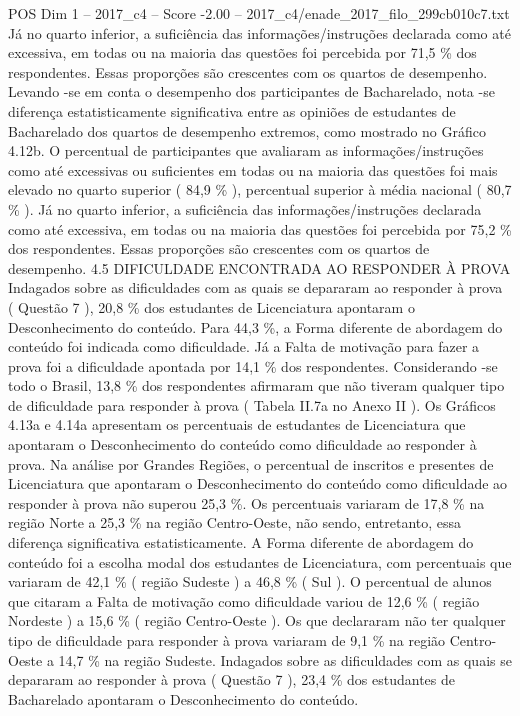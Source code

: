 \begin{textsample}{POS Dim 1 – 2017\_c4 – Score -2.00 – 2017\_c4/enade\_2017\_filo\_299cb010c7.txt}
Já no quarto inferior, a suficiência das informações/instruções declarada como até excessiva, em todas ou na maioria das questões foi percebida por 71,5 \% dos respondentes.
Essas proporções são crescentes com os quartos de desempenho.
Levando -se em conta o desempenho dos participantes de Bacharelado, nota -se diferença estatisticamente significativa entre as opiniões de estudantes de Bacharelado dos quartos de desempenho extremos, como mostrado no Gráfico 4.12b.
O percentual de participantes que avaliaram as informações/instruções como até excessivas ou suficientes em todas ou na maioria das questões foi mais elevado no quarto superior ( 84,9 \% ), percentual superior à média nacional ( 80,7 \% ).
Já no quarto inferior, a suficiência das informações/instruções declarada como até excessiva, em todas ou na maioria das questões foi percebida por 75,2 \% dos respondentes.
Essas proporções são crescentes com os quartos de desempenho. 4.5 DIFICULDADE ENCONTRADA AO RESPONDER À PROVA Indagados sobre as dificuldades com as quais se depararam ao responder à prova ( Questão 7 ), 20,8 \% dos estudantes de Licenciatura apontaram o Desconhecimento do conteúdo.
Para 44,3 \%, a Forma diferente de abordagem do conteúdo foi indicada como dificuldade.
Já a Falta de motivação para fazer a prova foi a dificuldade apontada por 14,1 \% dos respondentes.
Considerando -se todo o Brasil, 13,8 \% dos respondentes afirmaram que não tiveram qualquer tipo de dificuldade para responder à prova ( Tabela II.7a no Anexo II ).
Os Gráficos 4.13a e 4.14a apresentam os percentuais de estudantes de Licenciatura que apontaram o Desconhecimento do conteúdo como dificuldade ao responder à prova.
Na análise por Grandes Regiões, o percentual de inscritos e presentes de Licenciatura que apontaram o Desconhecimento do conteúdo como dificuldade ao responder à prova não superou 25,3 \%.
Os percentuais variaram de 17,8 \% na região Norte a 25,3 \% na região Centro-Oeste, não sendo, entretanto, essa diferença significativa estatisticamente.
A Forma diferente de abordagem do conteúdo foi a escolha modal dos estudantes de Licenciatura, com percentuais que variaram de 42,1 \% ( região Sudeste ) a 46,8 \% ( Sul ).
O percentual de alunos que citaram a Falta de motivação como dificuldade variou de 12,6 \% ( região Nordeste ) a 15,6 \% ( região Centro-Oeste ).
Os que declararam não ter qualquer tipo de dificuldade para responder à prova variaram de 9,1 \% na região Centro-Oeste a 14,7 \% na região Sudeste.
Indagados sobre as dificuldades com as quais se depararam ao responder à prova ( Questão 7 ), 23,4 \% dos estudantes de Bacharelado apontaram o Desconhecimento do conteúdo.

\end{textsample}
